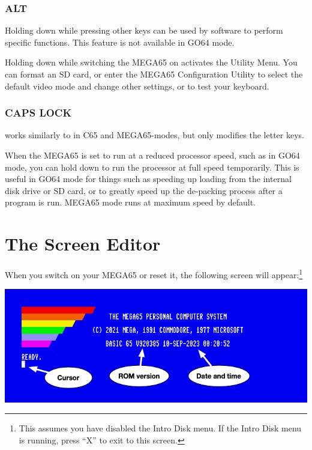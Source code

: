 \subsubsection{ALT}
Holding  down while pressing other keys can be used by software to perform specific functions. This feature is not available in GO64 mode.

Holding  down while switching the MEGA65 on activates the Utility Menu. You can format an SD card, or enter the MEGA65 Configuration Utility to select the default video mode and change other settings, or to test your keyboard.

\subsubsection{CAPS LOCK}
 works similarly to  in C65 and MEGA65-modes, but only modifies the letter keys.

When the MEGA65 is set to run at a reduced processor speed, such as in GO64 mode, you can hold down  to run the processor at full speed temporarily. This is useful in GO64 mode for things such as
speeding up loading from the internal disk drive or SD card, or to greatly speed up the de-packing process after a program is run. MEGA65 mode runs at maximum speed by default.



\section{The Screen Editor}
\label{sec:screen-editor}

When you switch on your MEGA65 or reset it, the following screen will appear:\footnote{This assumes you have disabled the Intro Disk menu. If the Intro Disk menu is running, press ``X'' to exit to this screen.}

\begin{center}
\includegraphics[width=0.9\linewidth]{images/introduction-screen/layout.png}
\end{center}

